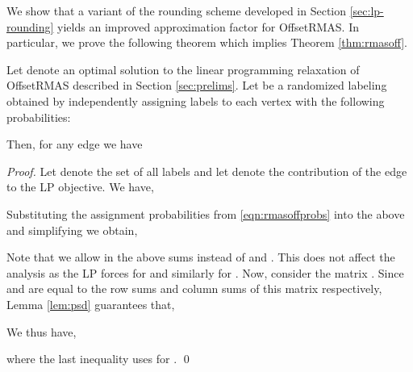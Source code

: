 \documentclass[oribibl]{llncs}
\newcommand{\rmasoff}{{\sc OffsetRMAS}\xspace}
\begin{document}
We show that a variant of the rounding scheme
developed in Section \ref{sec:lp-rounding} yields an improved
approximation factor for \rmasoff. 
In particular, we prove the following theorem which
implies Theorem \ref{thm:rmasoff}.
\begin{theorem}
\label{thm:rmasapprox}
Let  
denote an optimal solution to the linear programming relaxation of
\rmasoff described in Section \ref{sec:prelims}. Let  be a
randomized labeling obtained by independently assigning labels to
each vertex  with the following probabilities:
  
Then, for any edge  we have

\end{theorem}
\begin{proof}
Let  denote the set of all labels
and let 
denote the contribution of the edge  to the LP objective. We have,
  
  Substituting the assignment probabilities from \eqref{eqn:rmasoffprobs}
  into the above and simplifying we obtain,
  
Note that we allow  in the above sums instead of
 and . This does not affect the analysis as the LP forces  for  and similarly for .  Now, consider the
 matrix . Since
 and  are equal to the row sums and column sums of this
matrix respectively, Lemma \ref{lem:psd} guarantees that,

We thus have, 

where the last inequality uses 
 for .
\qed
\end{proof}
\end{document}
